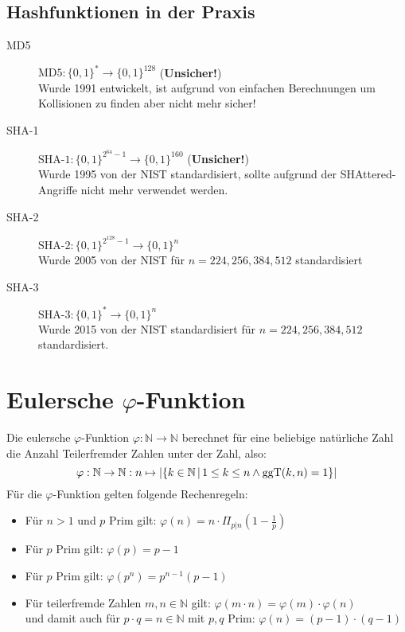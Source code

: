 		\subsection{Hashfunktionen in der Praxis}
			\begin{description}
				\item[MD5] \( \text{MD5} : \{0,1\}^* \rightarrow \{0,1\}^{128} \) \hfill(\textbf{Unsicher!}) \\ Wurde 1991 entwickelt, ist aufgrund von einfachen Berechnungen um Kollisionen zu finden aber nicht mehr sicher!
				\item[SHA-1] \( \text{SHA-1} : \{0,1\}^{2^{64}-1} \rightarrow \{0,1\}^{160} \) \hfill(\textbf{Unsicher!}) \\ Wurde 1995 von der NIST standardisiert, sollte aufgrund der SHAttered-Angriffe nicht mehr verwendet werden.
				\item[SHA-2] \( \text{SHA-2} : \{0,1\}^{2^{128}-1} \rightarrow \{0,1\}^{n} \) \\ Wurde 2005 von der NIST für \( n = 224, 256, 384, 512 \) standardisiert
				\item[SHA-3] \( \text{SHA-3} : \{0,1\}^* \rightarrow \{0,1\}^{n} \) \\ Wurde 2015 von der NIST standardisiert für \( n = 224, 256, 384, 512 \) standardisiert.
			\end{description}

	\section{Eulersche \(\varphi\)-Funktion}
		Die eulersche \(\varphi\)-Funktion \( \varphi : \mathbb{N} \rightarrow \mathbb{N} \) berechnet für eine beliebige natürliche Zahl die Anzahl Teilerfremder Zahlen unter der Zahl, also:
		\begin{equation*}
			\varphi : \mathbb{N} \rightarrow \mathbb{N} : n \mapsto \lvert \{ k \in \mathbb{N} \,\vert\, 1 \leq k \leq n \land \textrm{ggT}(k, n) = 1 \} \rvert
		\end{equation*}
		Für die \(\varphi\)-Funktion gelten folgende Rechenregeln:
		\begin{itemize}
			\item Für \(n > 1\) und \(p\) Prim gilt: \tabto{4.7cm} \( \varphi(n) = n \cdot \Pi_{p \vert n} (1 - \frac{1}{p}) \)
			\item Für \(p\) Prim gilt: \tabto{4.7cm} \( \varphi(p) = p - 1 \)
			\item Für \(p\) Prim gilt: \tabto{4.7cm} \( \varphi(p^n) = p^{n-1}(p-1) \)
			\item Für teilerfremde Zahlen \( m, n \in \mathbb{N} \) gilt: \tabto{8.2cm} \( \varphi(m \cdot n) = \varphi(m) \cdot \varphi(n) \) \\
				und damit auch für \(p \cdot q = n \in \mathbb{N} \) mit \(p,q\) Prim: \tabto{8.2cm} \( \varphi(n) = (p - 1) \cdot (q - 1) \)
		\end{itemize}

